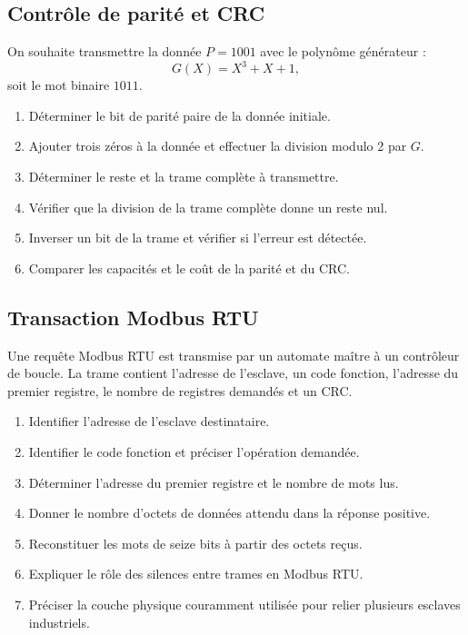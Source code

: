 
\subsection{Contrôle de parité et CRC}

On souhaite transmettre la donnée $P=1001$ avec le polynôme générateur :
\[
G(X)=X^3+X+1,
\]
soit le mot binaire $1011$.

\begin{enumerate}
  \item Déterminer le bit de parité paire de la donnée initiale.
  \item Ajouter trois zéros à la donnée et effectuer la division modulo 2 par $G$.
  \item Déterminer le reste et la trame complète à transmettre.
  \item Vérifier que la division de la trame complète donne un reste nul.
  \item Inverser un bit de la trame et vérifier si l'erreur est détectée.
  \item Comparer les capacités et le coût de la parité et du CRC.
\end{enumerate}

\subsection{Transaction Modbus RTU}

Une requête Modbus RTU est transmise par un automate maître à un contrôleur de boucle. La trame contient l'adresse de l'esclave, un code fonction, l'adresse du premier registre, le nombre de registres demandés et un CRC.


\begin{enumerate}
  \item Identifier l'adresse de l'esclave destinataire.
  \item Identifier le code fonction et préciser l'opération demandée.
  \item Déterminer l'adresse du premier registre et le nombre de mots lus.
  \item Donner le nombre d'octets de données attendu dans la réponse positive.
  \item Reconstituer les mots de seize bits à partir des octets reçus.
  \item Expliquer le rôle des silences entre trames en Modbus RTU.
  \item Préciser la couche physique couramment utilisée pour relier plusieurs esclaves industriels.
\end{enumerate}

